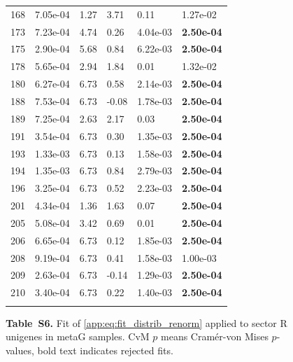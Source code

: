 \begin{figure}[htbp!]
{\begin{minipage}[t]{0.48\linewidth}
\begin{tabular}{llllll}
                    168 & 7.05e-04 & 1.27 & 3.71 & 0.11 & 1.27e-02\\
                    173 & 7.23e-04 & 4.74 & 0.26 & 4.04e-03 & \textbf{2.50e-04}\\
                    175 & 2.90e-04 & 5.68 & 0.84 & 6.22e-03 & \textbf{2.50e-04}\\
                    178 & 5.65e-04 & 2.94 & 1.84 & 0.01 & 1.32e-02\\
                    180 & 6.27e-04 & 6.73 & 0.58 & 2.14e-03 & \textbf{2.50e-04}\\
                    188 & 7.53e-04 & 6.73 & -0.08 & 1.78e-03 & \textbf{2.50e-04}\\
                    189 & 7.25e-04 & 2.63 & 2.17 & 0.03 & \textbf{2.50e-04}\\
                    191 & 3.54e-04 & 6.73 & 0.30 & 1.35e-03 & \textbf{2.50e-04}\\
                    193 & 1.33e-03 & 6.73 & 0.13 & 1.58e-03 & \textbf{2.50e-04}\\
                    194 & 1.35e-03 & 6.73 & 0.84 & 2.79e-03 & \textbf{2.50e-04}\\
                    196 & 3.25e-04 & 6.73 & 0.52 & 2.23e-03 & \textbf{2.50e-04}\\
                    201 & 4.34e-04 & 1.36 & 1.63 & 0.07 & \textbf{2.50e-04}\\
                    205 & 5.08e-04 & 3.42 & 0.69 & 0.01 & \textbf{2.50e-04}\\
                    206 & 6.65e-04 & 6.73 & 0.12 & 1.85e-03 & \textbf{2.50e-04}\\
                    208 & 9.19e-04 & 6.73 & 0.41 & 1.58e-03 & 1.00e-03\\
                    209 & 2.63e-04 & 6.73 & -0.14 & 1.29e-03 & \textbf{2.50e-04}\\
                    210 & 3.40e-04 & 6.73 & 0.22 & 1.40e-03 & \textbf{2.50e-04}\\
                     &  &  &  &  & \\
        \bottomrule
        \end{tabular}
    \end{minipage}
    }
    \caption*{\textbf{Table~S6.} Fit of \eqref{app:eq:fit_distrib_renorm} applied to sector R unigenes in metaG samples. CvM $p$ means Cram\'er-von Mises $p$-values, bold text indicates rejected fits.}
    \label{subtab:app:sector:metaG:R}
\end{figure}